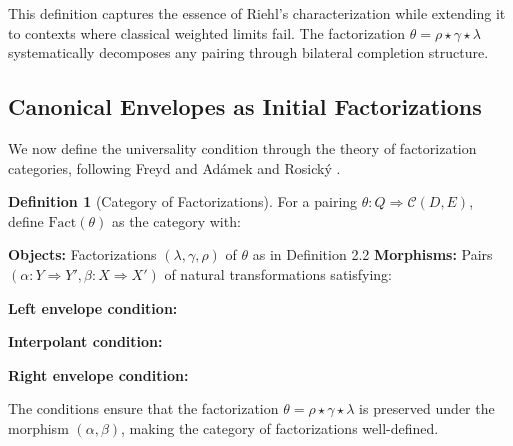 \documentclass[11pt]{article}
\theoremstyle{plain}
\theoremstyle{definition}
\newtheorem{definition}[theorem]{Definition}
\theoremstyle{remark}
\newcommand{\C}{\mathcal{C}}
\newcommand{\Fact}{\mathrm{Fact}}
\begin{document}
This definition captures the essence of Riehl's characterization while extending it to contexts where classical weighted limits fail. The factorization $\theta = \rho \star \gamma \star \lambda$ systematically decomposes any pairing through bilateral completion structure.

\subsection{Canonical Envelopes as Initial Factorizations}

We now define the universality condition through the theory of factorization categories, following Freyd \cite{freyd1964abelian} and  Ad\'{a}mek and Rosick\'{y} \cite{adamek1994locally}.

\begin{definition}[Category of Factorizations]
For a pairing $\theta : Q \Rightarrow \C(D, E)$, define $\Fact(\theta)$ as the category with:

\textbf{Objects:} Factorizations $(\lambda, \gamma, \rho)$ of $\theta$ as in Definition 2.2
\textbf{Morphisms:} Pairs $(\alpha : Y \Rightarrow Y', \beta : X \Rightarrow X')$ of natural transformations satisfying:

\textbf{Left envelope condition:}
\begin{center}
\end{center}


\textbf{Interpolant condition:}
\begin{center}
\end{center}

\textbf{Right envelope condition:}
\begin{center}
\end{center}

The conditions ensure that the factorization $\theta = \rho \star \gamma \star \lambda$ is preserved under the morphism $(\alpha, \beta)$, making the category of factorizations well-defined.
\end{definition}
\end{document}
